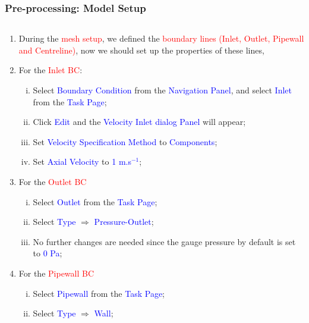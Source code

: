 \documentclass[10pt,compress, unknownkeysallowed]{beamer}
\newcommand{\red}{\textcolor{red}}
\newcommand{\blue}{\textcolor{blue}}
\begin{document}
\begin{frame}
  \frametitle{Pre-processing: Model Setup}
    \begin{columns}
        \begin{column}[l]{0.5\linewidth}
           \begin{enumerate}\scriptsize\setcounter{enumi}{8}
                \item<1-> During the \red{mesh setup}, we defined the \red{boundary lines (Inlet, Outlet, Pipewall and Centreline)}, now we should set up the properties of these lines, 
                \item<2-> For the \red{Inlet BC}:
                    \begin{enumerate}[i)]\scriptsize
                       \item<2-> Select \blue{Boundary Condition} from the \blue{Navigation Panel}, and select \blue{Inlet} from the \blue{Task Page};
                       \item<2-> Click \blue{Edit} and the \blue{Velocity Inlet dialog Panel} will appear;
                       \item<2-> Set \blue{Velocity Specification Method} to \blue{Components};
                       \item<2-> Set \blue{Axial Velocity} to \blue{1 m.s$^{-1}$}; 
                    \end{enumerate}
                \item<3-> For the \red{Outlet BC}
                    \begin{enumerate}[i)]\scriptsize
                       \item<3-> Select \blue{Outlet} from the \blue{Task Page};
                       \item<3-> Select \blue{Type} $\Rightarrow$ \blue{Pressure-Outlet};
                       \item<2-> No further changes are needed since the gauge pressure by default is set to \blue{0 Pa};
                    \end{enumerate}
                \item<4-> For the \red{Pipewall BC}
                    \begin{enumerate}[i)]\scriptsize
                       \item<4-> Select \blue{Pipewall} from the \blue{Task Page};
                       \item<4-> Select \blue{Type} $\Rightarrow$ \blue{Wall};
                    \end{enumerate}

\end{enumerate}
\end{column}
\end{columns}
\end{frame}
\end{document}
